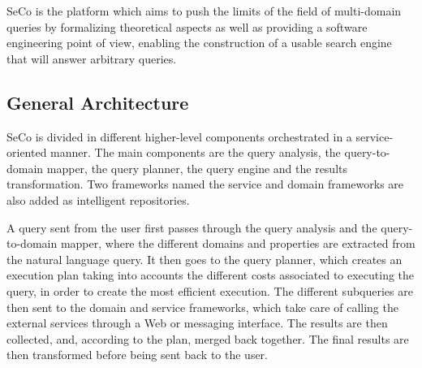 SeCo is the platform which aims to push the limits of the field of multi-domain queries by formalizing theoretical aspects as well as providing a software engineering point of view, enabling the construction of a usable search engine that will answer arbitrary queries.

\subsection{General Architecture} %
\label{sub:general_architecture}

SeCo is divided in different higher-level components orchestrated in a service-oriented manner. The main components are the query analysis, the query-to-domain mapper, the query planner, the query engine and the results transformation. Two frameworks named the service and domain frameworks are also added as intelligent repositories.

A query sent from the user first passes through the query analysis and the query-to-domain mapper, where the different domains and properties are extracted from the natural language query. It then goes to the query planner, which creates an execution plan taking into accounts the different costs associated to executing the query, in order to create the most efficient execution. The different subqueries are then sent to the domain and service frameworks, which take care of calling the external services through a Web or messaging interface. The results are then collected, and, according to the plan, merged back together. The final results are then transformed before being sent back to the user.


